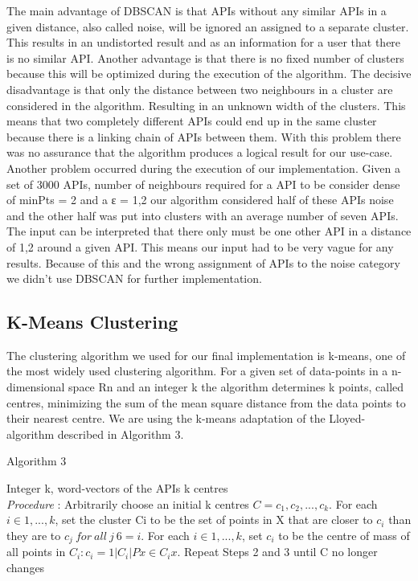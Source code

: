 \documentclass[a4paper]{IEEEtran}
\begin{document}
The main advantage of DBSCAN is that APIs without any similar APIs in a given distance, also called noise, will be ignored an assigned to a separate cluster. This results in an undistorted result and as an information for a user that there is no similar API. 
Another advantage is that there is no fixed number of clusters because this will be optimized during the execution of the algorithm.
The decisive disadvantage is that only the distance between two neighbours in a cluster are considered in the algorithm. Resulting in an unknown width of the clusters. This means that two completely different APIs could end up in the same cluster because there is a linking chain of APIs between them. With this problem there was no assurance that the algorithm produces a logical result for our use-case.
Another problem occurred during the execution of our implementation. Given a set of 3000 APIs, number of neighbours required for a API to be consider dense of minPts = 2 and a ε = 1,2 our algorithm considered half of these APIs noise and the other half was put into clusters with an average number of seven APIs. The input can be interpreted that there only must be one other API in a distance of 1,2 around a given API. This means our input had to be very vague for any results. Because of this and the wrong assignment of APIs to the noise category we didn’t use DBSCAN for further implementation.


\subsection{K-Means Clustering}
The clustering algorithm we used for our final implementation is k-means, one of the most widely used clustering algorithm. For a given set of data-points in a n-dimensional space Rn and an integer k the algorithm determines k points, called centres, minimizing the sum of the mean square distance from the data points to their nearest centre. We are using the k-means adaptation of the Lloyed-algorithm described in Algorithm 3.

\begin{algorithm}[H]
 \caption{Algorithm 3}
 \begin{algorithmic}[1]
\renewcommand{\algorithmicrequire}{\textbf{Input:}}
 \renewcommand{\algorithmicensure}{\textbf{Output:}}
 \REQUIRE Integer k, word-vectors of the APIs
 \ENSURE  k centres
 \\ \textit{Procedure} :
  \STATE Arbitrarily choose an initial k centres $C = {c_1, c_2, ..., c_k}$.
 \STATE For each $i \in {1, ..., k}$, set the cluster Ci to be the set of points in X that are closer to $c_i$ than
they are to $c_j~for ~all ~j ~6= i$.
\STATE For each $i \in {1, . . . , k}$, set $c_i$ to be the centre of mass of all points in $C_i : c_i = 1 |C_i| P x \in C_i x$.
\STATE Repeat Steps 2 and 3 until C no longer changes %

 \end{algorithmic}
 \end{algorithm}
\end{document}
